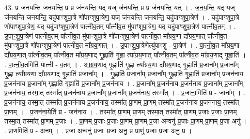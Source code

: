 \documentclass[17pt]{extarticle}
\begin{document}
43. प्र ज॑नयन्ति जनयन्ति॒ प्र प्र ज॑नयन्ति॒ यद् यज् ज॑नयन्ति॒ प्र प्र ज॑नयन्ति॒ यत् । . ज॒न॒य॒न्ति॒ यद् यज् ज॑नयन्ति जनयन्ति॒ यदु॑पाꣳशुपा॒त्रे णो॑पाꣳशुपा॒त्रेण॒ यज् ज॑नयन्ति जनयन्ति॒ यदु॑पाꣳशुपा॒त्रेण॑ । . यदु॑पाꣳशुपा॒त्रे णो॑पाꣳशुपा॒त्रेण॒ यद् यदु॑पाꣳशुपा॒त्रेण॑ पात्नीव॒तम् पा᳚त्नीव॒त मु॑पाꣳशुपा॒त्रेण॒ यद् यदु॑पाꣳशुपा॒त्रेण॑ पात्नीव॒तम् । . उ॒पाꣳ॒॒शु॒पा॒त्रेण॑ पात्नीव॒तम् पा᳚त्नीव॒त मु॑पाꣳशुपा॒त्रे णो॑पाꣳशुपा॒त्रेण॑ पात्नीव॒त मा᳚ग्रय॒णा दा᳚ग्रय॒णात् पा᳚त्नीव॒त मु॑पाꣳशुपा॒त्रे णो॑पाꣳशुपा॒त्रेण॑ पात्नीव॒त मा᳚ग्रय॒णात् । . उ॒पाꣳ॒॒शु॒पा॒त्रेणेत्यु॑पाꣳशु - पा॒त्रेण॑ । . पा॒त्नी॒व॒त मा᳚ग्रय॒णा दा᳚ग्रय॒णात् पा᳚त्नीव॒तम् पा᳚त्नीव॒त मा᳚ग्रय॒णाद् गृ॒ह्णाति॑ गृ॒ह्णा त्या᳚ग्रय॒णात् पा᳚त्नीव॒तम् पा᳚त्नीव॒त मा᳚ग्रय॒णाद् गृ॒ह्णाति॑ । . पा॒त्नी॒व॒तमिति॑ पात्नी - व॒तम् । . आ॒ग्र॒य॒णाद् गृ॒ह्णाति॑ गृ॒ह्णा त्या᳚ग्रय॒णा दा᳚ग्रय॒णाद् गृ॒ह्णाति॑ प्र॒जाना᳚म् प्र॒जाना᳚म् गृ॒ह्णा त्या᳚ग्रय॒णा दा᳚ग्रय॒णाद् गृ॒ह्णाति॑ प्र॒जाना᳚म् । . गृ॒ह्णाति॑ प्र॒जाना᳚म् प्र॒जाना᳚म् गृ॒ह्णाति॑ गृ॒ह्णाति॑ प्र॒जाना᳚म् प्र॒जन॑नाय प्र॒जन॑नाय प्र॒जाना᳚म् गृ॒ह्णाति॑ गृ॒ह्णाति॑ प्र॒जाना᳚म् प्र॒जन॑नाय । . प्र॒जाना᳚म् प्र॒जन॑नाय प्र॒जन॑नाय प्र॒जाना᳚म् प्र॒जाना᳚म् प्र॒जन॑नाय॒ तस्मा॒त् तस्मा᳚त् प्र॒जन॑नाय प्र॒जाना᳚म् प्र॒जाना᳚म् प्र॒जन॑नाय॒ तस्मा᳚त् । . प्र॒जाना॒मिति॑ प्र - जाना᳚म् । . प्र॒जन॑नाय॒ तस्मा॒त् तस्मा᳚त् प्र॒जन॑नाय प्र॒जन॑नाय॒ तस्मा᳚त् प्रा॒णम् प्रा॒णम् तस्मा᳚त् प्र॒जन॑नाय प्र॒जन॑नाय॒ तस्मा᳚त् प्रा॒णम् । . प्र॒जन॑ना॒येति॑ प्र - जन॑नाय । . तस्मा᳚त् प्रा॒णम् प्रा॒णम् तस्मा॒त् तस्मा᳚त् प्रा॒णम् प्र॒जाः प्र॒जाः प्रा॒णम् तस्मा॒त् तस्मा᳚त् प्रा॒णम् प्र॒जाः । . प्रा॒णम् प्र॒जाः प्र॒जाः प्रा॒णम् प्रा॒णम् प्र॒जा अन्वनु॑ प्र॒जाः प्रा॒णम् प्रा॒णम् प्र॒जा अनु॑ । . प्रा॒णमिति॑ प्र - अ॒नम् । . प्र॒जा अन्वनु॑ प्र॒जाः प्र॒जा अनु॒ प्र प्राणु॑ प्र॒जाः प्र॒जा अनु॒ प्र । \newline
\end{document}
